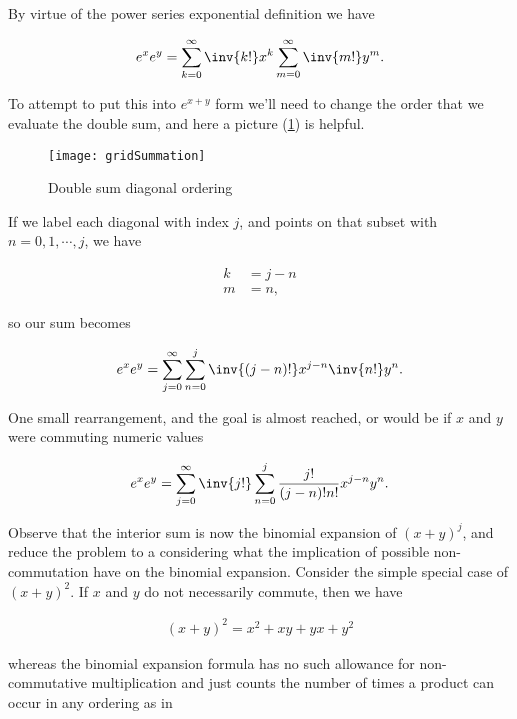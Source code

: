 By virtue of the power series exponential definition we have

\begin{align}\label{eqn:exponentialCommutation:3}
e^{x} e^{y} = 
\sum_{k=0}^\infty \inv{k!} x^k
\sum_{m=0}^\infty \inv{m!} y^m.
\end{align}

To attempt to put this into $e^{x + y}$ form we'll need to change the order that we evaluate the double sum, and here a picture (\ref{fig:gridSummation}) is helpful.

\begin{figure}[htp]
\centering
\texttt{[image: gridSummation]}
\caption{Double sum diagonal ordering}\label{fig:gridSummation}
\end{figure}

If we label each diagonal with index $j$, and points on that subset with $n=0,1,\cdots, j$, we have

\begin{align}\label{eqn:exponentialCommutation:4}
k &= j - n \\
m &= n,
\end{align}

so our sum becomes

\begin{align}\label{eqn:exponentialCommutation:5}
e^{x} e^{y} = 
\sum_{j=0}^\infty \sum_{n=0}^j
\inv{(j-n)!} x^{j-n}
\inv{n!} y^n.
\end{align}

One small rearrangement, and the goal is almost reached, or would be if $x$ and $y$ were commuting numeric values

\begin{align}\label{eqn:exponentialCommutation:6}
e^{x} e^{y} = 
\sum_{j=0}^\infty \inv{j!} \sum_{n=0}^j \frac{j!}{(j-n)! n!} x^{j-n} y^n.
\end{align}

Observe that the interior sum is now the binomial expansion of $(x + y)^j$, and reduce the problem to a considering what the implication of possible non-commutation have on the binomial expansion.  Consider the simple special case of $(x + y)^2$.  If $x$ and $y$ do not necessarily commute, then we have

\begin{align}\label{eqn:exponentialCommutation:7}
(x + y)^2 = x^2 + x y + y x + y^2
\end{align}

whereas the binomial expansion formula has no such allowance for non-commutative multiplication and just counts the number of times a product can occur in any ordering as in

